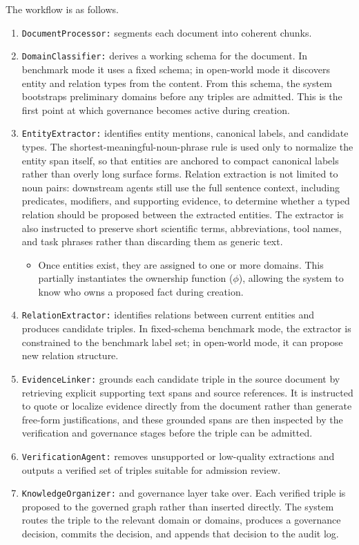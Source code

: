 \documentclass{article}
\begin{document}
The workflow is as follows.
\begin{enumerate}[leftmargin=*]
\item \texttt{DocumentProcessor:} segments each document into coherent chunks.
\item \texttt{DomainClassifier:} derives a working schema for the document. In benchmark mode it uses a fixed schema; in open-world mode it discovers entity and relation types from the content. From this schema, the system bootstraps preliminary domains before any triples are admitted. This is the first point at which governance becomes active during creation.
\item \texttt{EntityExtractor:} identifies entity mentions, canonical labels, and candidate types. The shortest-meaningful-noun-phrase rule is used only to normalize the entity span itself, so that entities are anchored to compact canonical labels rather than overly long surface forms. Relation extraction is not limited to noun pairs: downstream agents still use the full sentence context, including predicates, modifiers, and supporting evidence, to determine whether a typed relation should be proposed between the extracted entities. The extractor is also instructed to preserve short scientific terms, abbreviations, tool names, and task phrases rather than discarding them as generic text.
\begin{itemize}
\item Once entities exist, they are assigned to one or more domains. This partially instantiates the ownership function ($\phi$), allowing the system to know who owns a proposed fact during creation.
\end{itemize}
\item \texttt{RelationExtractor:} identifies relations between current entities and produces candidate triples. In fixed-schema benchmark mode, the extractor is constrained to the benchmark label set; in open-world mode, it can propose new relation structure.
\item \texttt{EvidenceLinker:} grounds each candidate triple in the source document by retrieving explicit supporting text spans and source references. It is instructed to quote or localize evidence directly from the document rather than generate free-form justifications, and these grounded spans are then inspected by the verification and governance stages before the triple can be admitted.
\item \texttt{VerificationAgent:} removes unsupported or low-quality extractions and outputs a verified set of triples suitable for admission review.
\item \texttt{KnowledgeOrganizer:} and governance layer take over. Each verified triple is proposed to the governed graph rather than inserted directly. The system routes the triple to the relevant domain or domains, produces a governance decision, commits the decision, and appends that decision to the audit log.
\end{enumerate}
\end{document}
